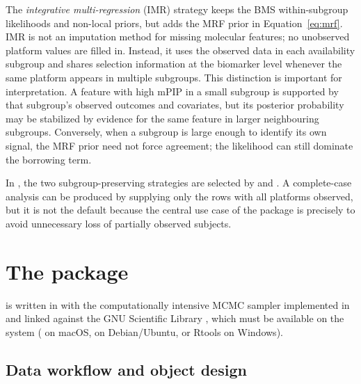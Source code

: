 \documentclass[article]{jss}
\begin{document}
The \emph{integrative multi-regression} (IMR) strategy keeps the BMS
within-subgroup likelihoods and non-local priors, but adds the MRF prior in
Equation~\ref{eq:mrf}.  IMR is not an imputation method for missing molecular
features; no unobserved platform values are filled in.  Instead, it uses the
observed data in each availability subgroup and shares selection information at
the biomarker level whenever the same platform appears in multiple subgroups.
This distinction is important for interpretation.  A feature with high mPIP in
a small subgroup is supported by that subgroup's observed outcomes and
covariates, but its posterior probability may be stabilized by evidence for the
same feature in larger neighbouring subgroups.  Conversely, when a subgroup is
large enough to identify its own signal, the MRF prior need not force agreement;
the likelihood can still dominate the borrowing term.

In , the two subgroup-preserving strategies are selected by
 and .  A complete-case analysis can
be produced by supplying only the rows with all platforms observed, but it is
not the default because the central use case of the package is precisely to
avoid unnecessary loss of partially observed subjects.

\section[The package IntegMultiReg]{The package }\label{sec:package}

 is written in  \citep{rcore} with the
computationally intensive MCMC sampler implemented in  and linked
against the GNU Scientific Library \citep[GSL,][]{galassi2009}, which must be
available on the system ( on macOS,
 on Debian/Ubuntu, or Rtools on Windows).

\subsection{Data workflow and object design}\label{sec:workflow}
\end{document}
